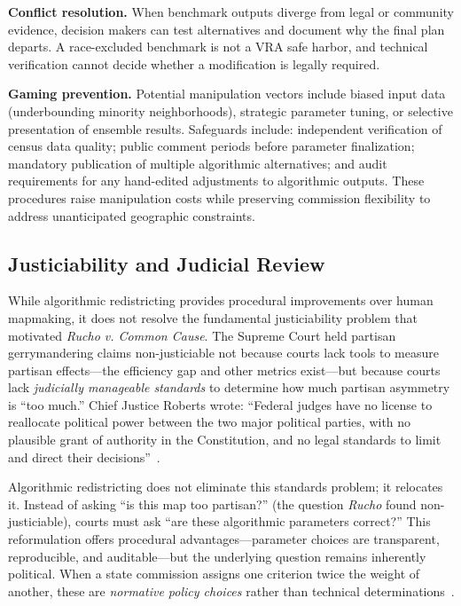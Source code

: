 \textbf{Conflict resolution.} When benchmark outputs diverge from legal or
community evidence, decision makers can test alternatives and document why the
final plan departs. A race-excluded benchmark is not a VRA safe harbor, and
technical verification cannot decide whether a modification is legally
required.

\textbf{Gaming prevention.} Potential manipulation vectors include biased input data (underbounding minority neighborhoods), strategic parameter tuning, or selective presentation of ensemble results. Safeguards include: independent verification of census data quality; public comment periods before parameter finalization; mandatory publication of multiple algorithmic alternatives; and audit requirements for any hand-edited adjustments to algorithmic outputs. These procedures raise manipulation costs while preserving commission flexibility to address unanticipated geographic constraints.

\subsection{Justiciability and Judicial Review}

While algorithmic redistricting provides procedural improvements over human mapmaking, it does not resolve the fundamental justiciability problem that motivated \emph{Rucho v. Common Cause}. The Supreme Court held partisan gerrymandering claims non-justiciable not because courts lack tools to measure partisan effects---the efficiency gap and other metrics exist---but because courts lack \emph{judicially manageable standards} to determine how much partisan asymmetry is ``too much.'' Chief Justice Roberts wrote: ``Federal judges have no license to reallocate political power between the two major political parties, with no plausible grant of authority in the Constitution, and no legal standards to limit and direct their decisions''~\cite{rucho2019}.

Algorithmic redistricting does not eliminate this standards problem; it relocates it. Instead of asking ``is this map too partisan?'' (the question \emph{Rucho} found non-justiciable), courts must ask ``are these algorithmic parameters correct?'' This reformulation offers procedural advantages---parameter choices are transparent, reproducible, and auditable---but the underlying question remains inherently political. When a state commission assigns one criterion twice the weight of another, these are \emph{normative policy choices} rather than technical determinations~\cite{deluca2026edgeweighted}.

